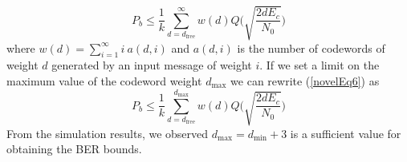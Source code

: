 \begin{equation}
P_b \leq \frac{1}{k} \sum_{d=d_{\text{free}}}^{\infty} w(d) Q\Bigg( \sqrt{\frac{2dE_c}{N_0}}\Bigg)
\label{novelEq6}
\end{equation}
where $w(d)=\sum_{i=1}^{\infty} i~ a(d,i)$ and $ a(d,i)$ is the number of codewords of weight $d$ generated by an input message of weight $i$. If we set a limit on the maximum value of the codeword weight $d_{\text{max}}$
 we can rewrite (\ref{novelEq6}) as 
\begin{equation}
P_b \leq \frac{1}{k} \sum_{d=d_{\text{free}}}^{d_{\text{max}}} w(d) Q\Bigg( \sqrt{\frac{2dE_c}{N_0}}\Bigg)
\label{novelEq7}
\end{equation}
 From the simulation results, we observed $d_{\text{max}}=d_{\text{min}}+3$ is a sufficient value for obtaining the BER bounds.
